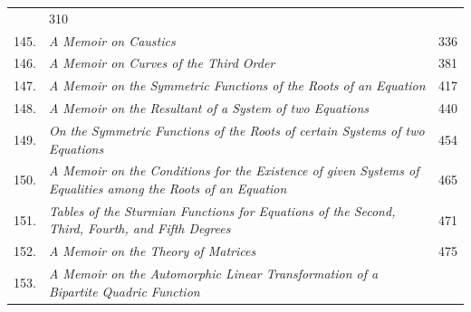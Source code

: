 \documentclass[11pt]{article}
\begin{document}
\begin{longtable}{@{}r p{} r@{}}
\hspace{1em}{\footnotesize Phil.\ Trans.\ t.\ cxlvi.\ (for 1856), pp.\ 627---647} & 310 \\
145. & \emph{A Memoir on Caustics} \dotfill \par
\hspace{1em}{\footnotesize Phil.\ Trans.\ t.\ cxlvii.\ (for 1857), pp.\ 273---312} & 336 \\
146. & \emph{A Memoir on Curves of the Third Order} \dotfill \par
\hspace{1em}{\footnotesize Phil.\ Trans.\ t.\ cxlvii.\ (for 1857), pp.\ 415---446} & 381 \\
147. & \emph{A Memoir on the Symmetric Functions of the Roots of an Equation} \dotfill \par
\hspace{1em}{\footnotesize Phil.\ Trans.\ t.\ cxlvii.\ (for 1857), pp.\ 489---496} & 417 \\
148. & \emph{A Memoir on the Resultant of a System of two Equations} \dotfill \par
\hspace{1em}{\footnotesize Phil.\ Trans.\ t.\ cxlvii.\ (for 1857), pp.\ 703---715} & 440 \\
149. & \emph{On the Symmetric Functions of the Roots of certain Systems of two Equations} \dotfill \par
\hspace{1em}{\footnotesize Phil.\ Trans.\ t.\ cxlvii.\ (for 1857), pp.\ 717---726} & 454 \\
150. & \emph{A Memoir on the Conditions for the Existence of given Systems of Equalities among the Roots of an Equation} \dotfill \par
\hspace{1em}{\footnotesize Phil.\ Trans.\ t.\ cxlvii.\ (for 1857), pp.\ 727---731} & 465 \\
151. & \emph{Tables of the Sturmian Functions for Equations of the Second, Third, Fourth, and Fifth Degrees} \dotfill \par
\hspace{1em}{\footnotesize Phil.\ Trans.\ t.\ cxlvii.\ (for 1857), pp.\ 733---736} & 471 \\
152. & \emph{A Memoir on the Theory of Matrices} \dotfill \par
\hspace{1em}{\footnotesize Phil.\ Trans.\ t.\ cxlviii.\ (for 1858), pp.\ 17---37} & 475 \\
153. & \emph{A Memoir on the Automorphic Linear Transformation of a Bipartite Quadric Function} \dotfill \par

\end{longtable}
\end{document}
